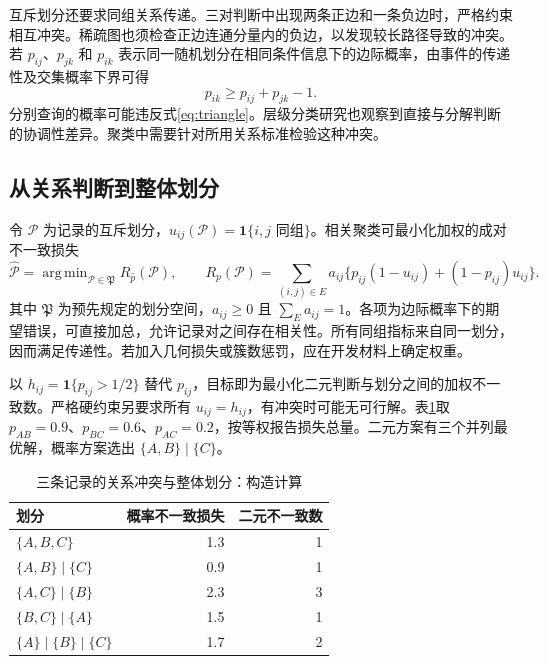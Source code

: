 \documentclass[UTF8,a4paper,zihao=-4,fontset=fandol]{ctexart}
\newcommand{\ind}{\mathbf 1}
\DeclareMathOperator*{\argmin}{arg\,min}
\begin{document}
互斥划分还要求同组关系传递。三对判断中出现两条正边和一条负边时，严格约束相互冲突。稀疏图也须检查正边连通分量内的负边，以发现较长路径导致的冲突。若 $p_{ij}$、$p_{jk}$ 和 $p_{ik}$ 表示同一随机划分在相同条件信息下的边际概率，由事件的传递性及交集概率下界可得
\begin{equation}
 p_{ik}\geq p_{ij}+p_{jk}-1.
 \label{eq:triangle}
\end{equation}
分别查询的概率可能违反式\eqref{eq:triangle}。层级分类研究也观察到直接与分解判断的协调性差异\citep{joy2026}。聚类中需要针对所用关系标准检验这种冲突。

\subsection{从关系判断到整体划分}

令 $\mathcal P$ 为记录的互斥划分，$u_{ij}(\mathcal P)=\ind\{i,j\text{ 同组}\}$。相关聚类可最小化加权的成对不一致损失\citep{bansal2004}
\begin{equation}
 \widehat{\mathcal P}=\argmin_{\mathcal P\in\mathfrak P}
 R_{\widehat p}(\mathcal P),\qquad
 R_p(\mathcal P)=\sum_{(i,j)\in E}a_{ij}
 \{p_{ij}(1-u_{ij})+(1-p_{ij})u_{ij}\}.
 \label{eq:partition}
\end{equation}
其中 $\mathfrak P$ 为预先规定的划分空间，$a_{ij}\geq0$ 且 $\sum_Ea_{ij}=1$。各项为边际概率下的期望错误，可直接加总，允许记录对之间存在相关性。所有同组指标来自同一划分，因而满足传递性。若加入几何损失或簇数惩罚，应在开发材料上确定权重。

以 $h_{ij}=\ind\{p_{ij}>1/2\}$ 替代 $p_{ij}$，目标即为最小化二元判断与划分之间的加权不一致数。严格硬约束另要求所有 $u_{ij}=h_{ij}$，有冲突时可能无可行解。表\ref{tab:three}取 $p_{AB}=0.9$、$p_{BC}=0.6$、$p_{AC}=0.2$，按等权报告损失总量。二元方案有三个并列最优解，概率方案选出 $\{A,B\}\mid\{C\}$。

\begin{table}[htbp]
\centering\small
\caption{三条记录的关系冲突与整体划分：构造计算}\label{tab:three}
\begin{tabular}{@{}lrr@{}}
\toprule
划分 & 概率不一致损失 & 二元不一致数 \\
\midrule
$\{A,B,C\}$ & 1.3 & 1 \\
$\{A,B\}\mid\{C\}$ & 0.9 & 1 \\
$\{A,C\}\mid\{B\}$ & 2.3 & 3 \\
$\{B,C\}\mid\{A\}$ & 1.5 & 1 \\
$\{A\}\mid\{B\}\mid\{C\}$ & 1.7 & 2 \\
\bottomrule
\end{tabular}
\end{table}
\end{document}
